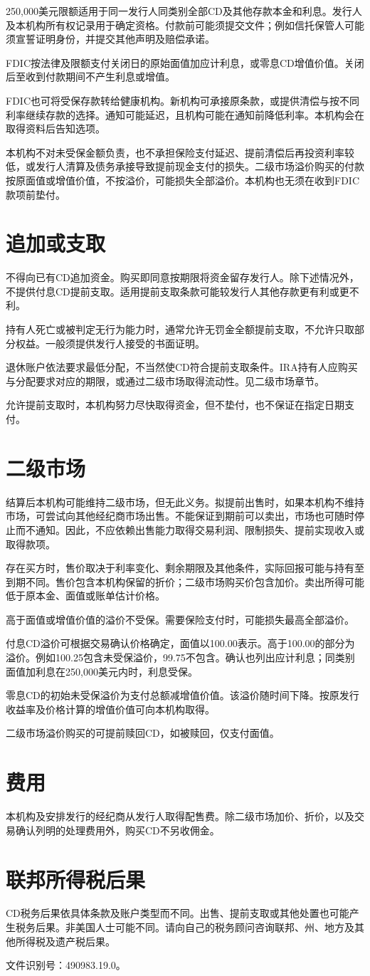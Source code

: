 \documentclass[UTF8,fontset=none,11pt,a4paper]{ctexart}
\begin{document}
250,000美元限额适用于同一发行人同类别全部CD及其他存款本金和利息。发行人及本机构所有权记录用于确定资格。付款前可能须提交文件；例如信托保管人可能须宣誓证明身份，并提交其他声明及赔偿承诺。


FDIC按法律及限额支付关闭日的原始面值加应计利息，或零息CD增值价值。关闭后至收到付款期间不产生利息或增值。


FDIC也可将受保存款转给健康机构。新机构可承接原条款，或提供清偿与按不同利率继续存款的选择。通知可能延迟，且机构可能在通知前降低利率。本机构会在取得资料后告知选项。


本机构不对未受保金额负责，也不承担保险支付延迟、提前清偿后再投资利率较低，或发行人清算及债务承接导致提前现金支付的损失。二级市场溢价购买的付款按原面值或增值价值，不按溢价，可能损失全部溢价。本机构也无须在收到FDIC款项前垫付。


\section*{追加或支取}
不得向已有CD追加资金。购买即同意按期限将资金留存发行人。除下述情况外，不提供付息CD提前支取。适用提前支取条款可能较发行人其他存款更有利或更不利。


持有人死亡或被判定无行为能力时，通常允许无罚金全额提前支取，不允许只取部分权益。一般须提供发行人接受的书面证明。


退休账户依法要求最低分配，不当然使CD符合提前支取条件。IRA持有人应购买与分配要求对应的期限，或通过二级市场取得流动性。见二级市场章节。


允许提前支取时，本机构努力尽快取得资金，但不垫付，也不保证在指定日期支付。


\section*{二级市场}
结算后本机构可能维持二级市场，但无此义务。拟提前出售时，如果本机构不维持市场，可尝试向其他经纪商市场出售。不能保证到期前可以卖出，市场也可随时停止而不通知。因此，不应依赖出售能力取得交易利润、限制损失、提前实现收入或取得款项。


存在买方时，售价取决于利率变化、剩余期限及其他条件，实际回报可能与持有至到期不同。售价包含本机构保留的折价；二级市场购买价包含加价。卖出所得可能低于原本金、面值或账单估计价格。


高于面值或增值价值的溢价不受保。需要保险支付时，可能损失最高全部溢价。


付息CD溢价可根据交易确认价格确定，面值以100.00表示。高于100.00的部分为溢价。例如100.25包含未受保溢价，99.75不包含。确认也列出应计利息；同类别面值加利息在250,000美元内时，利息受保。


零息CD的初始未受保溢价为支付总额减增值价值。该溢价随时间下降。按原发行收益率及价格计算的增值价值可向本机构取得。


二级市场溢价购买的可提前赎回CD，如被赎回，仅支付面值。


\section*{费用}
本机构及安排发行的经纪商从发行人取得配售费。除二级市场加价、折价，以及交易确认列明的处理费用外，购买CD不另收佣金。


\section*{联邦所得税后果}
CD税务后果依具体条款及账户类型而不同。出售、提前支取或其他处置也可能产生税务后果。非美国人士可能不同。请向自己的税务顾问咨询联邦、州、地方及其他所得税及遗产税后果。


文件识别号：490983.19.0。
\end{document}
